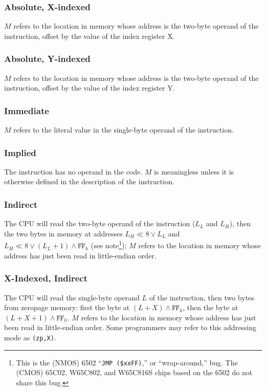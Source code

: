 \documentclass[12pt]{{memoir}}
\begin{document}
\subsubsection{Absolute, X-indexed}
$M$ refers to the location in memory whose address is the two-byte operand of the instruction, offset by the value of the index register X.\pbf

\subsubsection{Absolute, Y-indexed}
$M$ refers to the location in memory whose address is the two-byte operand of the instruction, offset by the value of the index register Y.\pbf

\subsubsection{Immediate}
$M$ refers to the literal value in the single-byte operand of the instruction.

\subsubsection{Implied}
The instruction has no operand in the code. $M$ is meaningless unless it is otherwise defined in the description of the instruction.

\subsubsection{Indirect}
The CPU will read the two-byte operand of the instruction ($L_L$ and $L_H$), then the two bytes in memory at addresses $L_H \ll 8 \vee L_L$ and $L_H \ll 8 \vee (L_L + 1) \wedge \texttt{FF}_h$ (see note\footnote{This is the (NMOS) 6502 ``\texttt{JMP (\$xxFF)},'' or ``wrap-around,'' bug. The (CMOS) 65C02, W65C802, and W65C816S chips based on the 6502 do not share this bug.}); $M$ refers to the location in memory whose address has just been read in little-endian order.

\subsubsection{X-Indexed, Indirect}
The CPU will read the single-byte operand $L$ of the instruction, then two bytes from zeropage memory: first the byte at $(L + X) \wedge \texttt{FF}_h$, then the byte at $(L + X + 1) \wedge \texttt{FF}_h$. $M$ refers to the location in memory whose address has just been read in little-endian order. Some programmers may refer to this addressing mode as \texttt{(zp,X)}.
\end{document}
